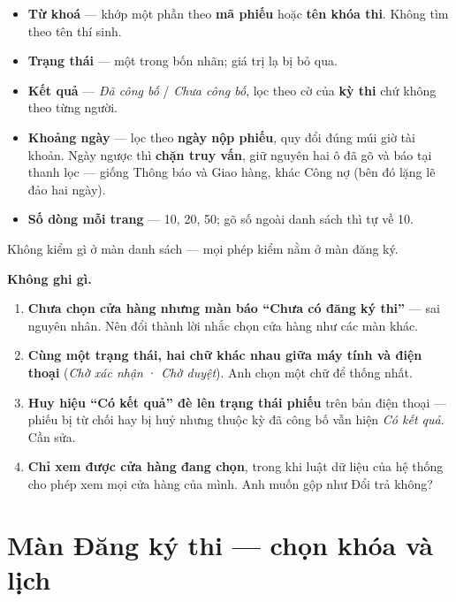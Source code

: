 \begin{itemize}[leftmargin=*]
  \item \textbf{Từ khoá} --- khớp một phần theo \textbf{mã phiếu} hoặc \textbf{tên khóa thi}.
        Không tìm theo tên thí sinh.
  \item \textbf{Trạng thái} --- một trong bốn nhãn; giá trị lạ bị bỏ qua.
  \item \textbf{Kết quả} --- \emph{Đã công bố} / \emph{Chưa công bố}, lọc theo cờ của
        \textbf{kỳ thi} chứ không theo từng người.
  \item \textbf{Khoảng ngày} --- lọc theo \textbf{ngày nộp phiếu}, quy đổi đúng múi giờ tài
        khoản. Ngày ngược thì \textbf{chặn truy vấn}, giữ nguyên hai ô đã gõ và báo tại thanh
        lọc --- giống Thông báo và Giao hàng, khác Công nợ (bên đó lặng lẽ đảo hai ngày).
  \item \textbf{Số dòng mỗi trang} --- 10, 20, 50; gõ số ngoài danh sách thì tự về 10.
\end{itemize}


Không kiểm gì ở màn danh sách --- mọi phép kiểm nằm ở màn đăng ký.

\mghi

\textbf{Không ghi gì.}

\mhoi

\begin{ask}
\begin{enumerate}[leftmargin=*]
  \item \textbf{Chưa chọn cửa hàng nhưng màn báo ``Chưa có đăng ký thi''} --- sai nguyên nhân.
        Nên đổi thành lời nhắc chọn cửa hàng như các màn khác.
  \item \textbf{Cùng một trạng thái, hai chữ khác nhau giữa máy tính và điện thoại}
        (\emph{Chờ xác nhận} · \emph{Chờ duyệt}). Anh chọn một chữ để thống nhất.
  \item \textbf{Huy hiệu ``Có kết quả'' đè lên trạng thái phiếu} trên bản điện thoại --- phiếu
        bị từ chối hay bị huỷ nhưng thuộc kỳ đã công bố vẫn hiện \emph{Có kết quả}. Cần sửa.
  \item \textbf{Chỉ xem được cửa hàng đang chọn}, trong khi luật dữ liệu của hệ thống cho phép
        xem mọi cửa hàng của mình. Anh muốn gộp như Đổi trả không?
\end{enumerate}
\end{ask}

\section{Màn Đăng ký thi --- chọn khóa và lịch}
 
\medskip

